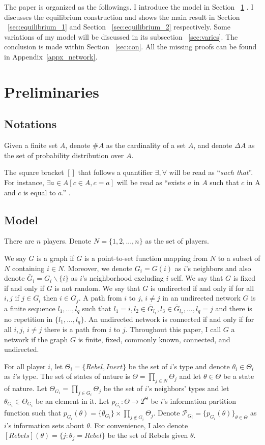 \documentclass[12pt,letter]{article}
\theoremstyle{definition}
\theoremstyle{remark}
\theoremstyle{claim}
\begin{document}
The paper is organized as the followings. I introduce the model in Section ~\ref{sec:model} . I discusses the equilibrium construction and shows the main result in Section ~\ref{sec:equilibrium_1} and Section ~\ref{sec:equilibrium_2} respectively. Some variations of my model will be discussed in its subsection ~\ref{sec:varies}. The conclusion is made within Section ~\ref{sec:con}. All the missing proofs can be found in Appendix~\ref{appx_network}.

\section{Preliminaries}
\label{sec:model}
\subsection{Notations}
Given a finite set $A$, denote $\#A$ as the cardinality of a set $A$, and denote $\Delta A$ as the set of probability distribution over $A$. 

The square bracket $[]$ that follows a quantifier $\exists, \forall$ will be read as ``\textit{such that}''. For instance, $\exists a \in A [c\in A, c=a]$ will be read as ``exists $a$ in $A$ such that $c$ in A and $c$ is equal to $a$.'' .
\subsection{Model}


There are $n$ players. Denote $N=\{1,2,...,n\}$ as the set of players.  

We say $G$ is a graph if $G$ is a point-to-set function mapping from $N$ to a subset of $N$ containing $i\in N$. Moreover, we denote $G_i=G(i)$ as $i$'s neighbors and also denote $\bar{G}_i=G_i\backslash \{i\}$ as $i$'s neighborhood excluding $i$ self. We say that $G$ is fixed if and only if $G$ is not random. We say that $G$ is undirected if and only if for all $i,j$ if $j\in G_i$ then $i\in G_j$. A path from $i$ to $j$, $i\neq j$ in an undirected network $G$ is a finite sequence $l_1,...,l_q$ such that $l_1=i, l_2\in \bar{G}_{l_1}, l_3\in \bar{G}_{l_2},...,l_q=j$ and there is no repetition in $\{l_1,...,l_q\}$. An undirected network is connected if and only if for all $i,j$, $i\neq j$ there is a path from $i$ to $j$. Throughout this paper, I call $G$ a network if the graph $G$ is finite, fixed, commonly known, connected, and undirected. 

For all player $i$, let $\Theta_i=\{Rebel,Inert\}$ be the set of $i$'s type and denote $\theta_i\in \Theta_i$ as $i$'s type. The set of states of nature is $\Theta=\prod_{j\in N}\Theta_j$ and let $\theta\in \Theta$ be a state of nature. Let $\Theta_{G_i}=\prod_{j\in G_i}\Theta_j$ be the set of $i$'s neighbors' types and let $\theta_{G_i}\in \Theta_{G_i}$ be an element in it. Let $p_{G_i}:\Theta \rightarrow 2^{\Theta}$ be $i$'s information partition function such that $p_{G_i}(\theta)=\{\theta_{G_i}\}\times \prod_{j\not\in G_i}\Theta_j$.  Denote $\mathcal{P}_{G_i}=\{p_{G_i}(\theta)\}_{\theta\in \Theta}$ as $i$'s information sets about $\theta$. For convenience, I also denote $[Rebels](\theta)=\{j:\theta_j=Rebel\}$ be the set of Rebels given $\theta$.
\end{document}
